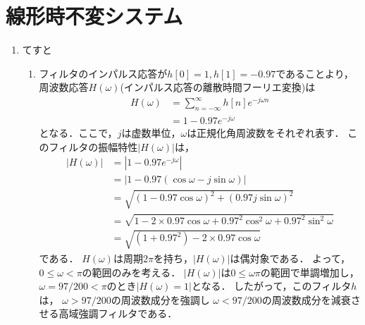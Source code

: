 \section{線形時不変システム}

\begin{enumerate}[label=問\arabic*.]
  \vspace{2mm}
  \item てすと
  \vspace{1mm}
  \begin{enumerate}[label=(\roman*)]
    \item フィルタのインパルス応答が$h[0] = 1, h[1] = -0.97$であることより，
      周波数応答$H(\omega)$(インパルス応答の離散時間フーリエ変換)は
      \begin{align}
        H(\omega) &= \sum_{n = -\infty}^{\infty} h[n] e^{-j\omega n} \\
                  &= 1 - 0.97 e^{-j \omega}
      \end{align}
      となる．ここで，$j$は虚数単位，$\omega$は正規化角周波数をそれぞれ表す．
      このフィルタの振幅特性$|H(\omega)|$は，
      \begin{align}
        |H(\omega)| &= | 1 - 0.97 e^{-j \omega}| \\
                    &= | 1 - 0.97 (\cos \omega - j \sin \omega)| \\
                    &= \sqrt{(1 - 0.97 \cos \omega)^2 + (0.97 j \sin \omega)^2} \\
                    &= \sqrt{1 - 2 \times 0.97 \cos \omega + 0.97^2 \cos^2 \omega
                     + 0.97^2 \sin^2 \omega} \\
                    &= \sqrt{(1 + 0.97^2) - 2 \times 0.97 \cos \omega}
      \end{align}
      である．
      $H(\omega)$は周期$2\pi$を持ち，$|H(\omega)|$は偶対象である．
      よって，$0 \le \omega < \pi$の範囲のみを考える．
      $|H(\omega)|$は$0 \le \omega \pi$の範囲で単調増加し，
      $\omega = 97 / 200 < \pi$のとき$|H(\omega) = 1|$となる．
      したがって，このフィルタ$h$は，
      $\omega > 97 / 200$の周波数成分を強調し
      $\omega < 97 / 200$の周波数成分を減衰させる高域強調フィルタである．
  \end{enumerate}
  
\end{enumerate}
